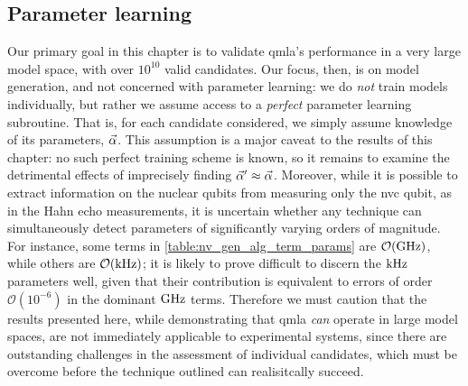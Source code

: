 \par 

\subsection{Parameter learning}
Our primary goal in this chapter is to validate \gls{qmla}'s performance in a 
    very large \gls{model space}, with over $10^{10}$ valid candidates. 
Our focus, then, is on model generation, and not concerned with parameter learning:
    we do \emph{not} train models individually, but rather we assume access to a \emph{perfect} parameter learning subroutine.
That is, for each candidate considered, we simply assume knowledge of its parameters, $\vec{\alpha}$. 
This assumption is a major caveat to the results of this chapter: 
    no such perfect training scheme is known, 
    so it remains to examine the detrimental effects of imprecisely finding $\vec{\alpha}^{\prime} \approx \vec{\alpha}$. 
Moreover, while it is possible to extract information on the nuclear qubits from measuring only the 
    \gls{nvc} qubit, as in the Hahn echo measurements, 
    it is uncertain whether any technique can simultaneously detect parameters of significantly varying orders of magnitude.
For instance, some terms in \cref{table:nv_gen_alg_term_params} are $\mathcal{O}(\textrm{GHz})$, 
    while others are $\mathcal{O}(\textrm{kHz})$;
    it is likely to prove difficult to discern the $\textrm{kHz}$ parameters well, given that their contribution is equivalent 
    to errors of order $\mathcal{O}(10^{-6})$ in the dominant $\textrm{GHz}$ terms. 
Therefore we must caution that the results presented here, 
    while demonstrating that \gls{qmla} \emph{can} operate in large model spaces, 
    are not immediately applicable to experimental systems, 
    since there are outstanding challenges in the assessment of individual candidates, 
    which must be overcome before the technique outlined can realisitcally succeed. 


